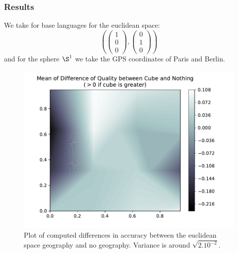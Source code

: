 \documentclass[ratio=169]{beamercours}
\begin{document}
\begin{frame}[allowframebreaks]
	\frametitle{Results}
	We take for base languages for the euclidean space:
	\begin{equation*}
		\left( \begin{pmatrix}
	1\\
	0\\
	0
\end{pmatrix}, \begin{pmatrix}
	0\\
	1\\
	0
\end{pmatrix}\right)
	\end{equation*}
	and for the sphere $\S^{1}$ we take the GPS coordinates of Paris and Berlin.

	\framebreak

\begin{figure}[H]
	\centering
	\includegraphics[width=.6\textwidth]{../Figures/qual_diff_cube_none}
	\caption{Plot of computed differences in accuracy between the euclidean space geography and no geography. Variance is around $\sqrt{2.10^{-2}}$.}
	\label{cubenone}
\end{figure}

	\framebreak



\end{frame}
\end{document}
